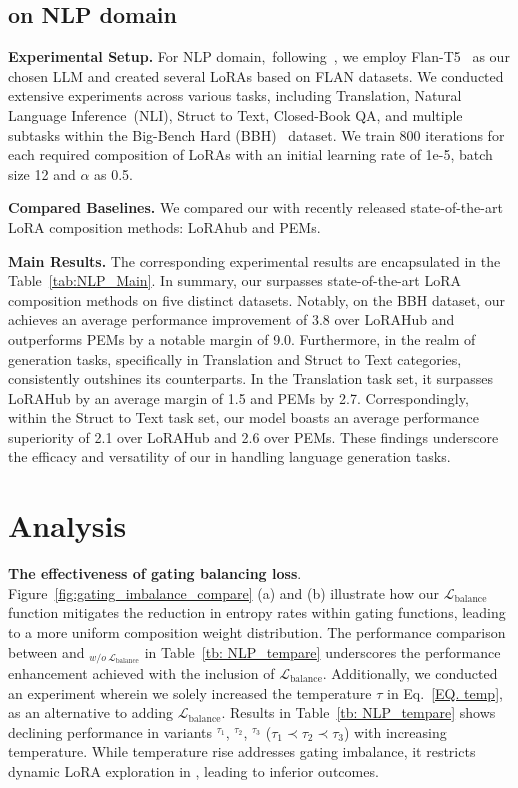 \subsection{\our{} on NLP domain}
\noindent\textbf{Experimental Setup.} For NLP domain,~following~\citep{huang2023lorahub}, we employ Flan-T5~\citep{flant5} as our chosen LLM and created several LoRAs based on FLAN datasets. 
We conducted extensive experiments across various tasks, including Translation, Natural Language Inference~(NLI), Struct to Text, Closed-Book QA, and multiple subtasks within the Big-Bench Hard (BBH)~\citep{ghazal2013bigbench} dataset.
We train 800 iterations for each required composition of LoRAs with an initial learning rate of 1e-5, batch size 12 and $\alpha$ as 0.5.

\noindent\textbf{Compared Baselines.} We compared our \our{} with recently released state-of-the-art LoRA composition methods: LoRAhub and PEMs.

\noindent\textbf{Main Results.} The corresponding experimental results are encapsulated in the Table~\ref{tab:NLP_Main}. In summary, our \our{} surpasses state-of-the-art LoRA composition methods on five distinct datasets. Notably, on the BBH dataset, our \our{} achieves an average performance improvement of 3.8 over LoRAHub and outperforms PEMs by a notable margin of 9.0.
Furthermore, in the realm of generation tasks, specifically in Translation and Struct to Text categories, \our{} consistently outshines its counterparts. In the Translation task set, it surpasses LoRAHub by an average margin of 1.5 and PEMs by 2.7. Correspondingly, within the Struct to Text task set, our model boasts an average performance superiority of 2.1 over LoRAHub and 2.6 over PEMs. These findings underscore the efficacy and versatility of our \our{} in handling language generation tasks.

\section{Analysis}
\label{Sec:detailed_analysis}
\vspace{-1mm}
\noindent\textbf{The effectiveness of gating balancing loss}. Figure~\ref{fig:gating_imbalance_compare} (a) and (b) illustrate how our $\mathcal{L}_{\text{balance}}$ function mitigates the reduction in entropy rates within gating functions, leading to a more uniform composition weight distribution.
The performance comparison between \our{} and \our{} $_{w/o~\mathcal{L}_{\text{balance}}}$ in Table~\ref{tb: NLP_tempare} underscores the performance enhancement achieved with the inclusion of $\mathcal{L}_{\text{balance}}$.
Additionally, we conducted an experiment wherein we solely increased the temperature $\tau$ in Eq.~\ref{EQ. temp}, as an alternative to adding $\mathcal{L}_{\text{balance}}$. Results in Table~\ref{tb: NLP_tempare} shows declining performance in \our{} variants \our$^{\tau_1}$, \our$^{\tau_2}$, \our$^{\tau_3}$ ($\tau_1 \prec \tau_2 \prec \tau_3$) with increasing temperature. While temperature rise addresses gating imbalance, it restricts dynamic LoRA exploration in \our, leading to inferior outcomes.


